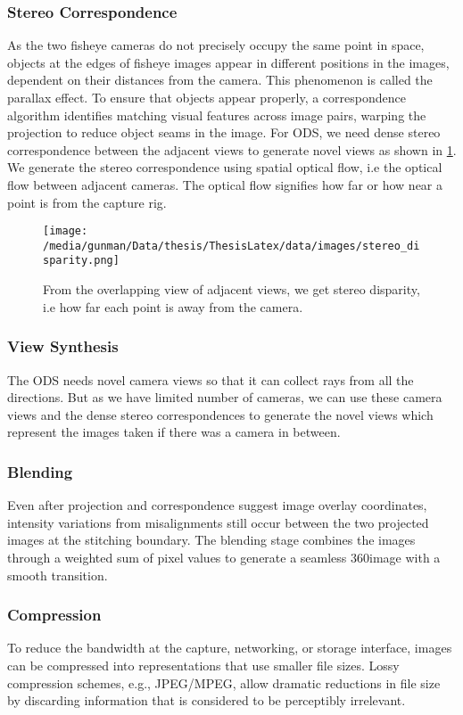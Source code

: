 \subsubsection{Stereo Correspondence}  As the two fisheye cameras do not precisely occupy the same point in space, objects at the edges of fisheye images appear in different positions in the images, dependent on their distances from the camera. This phenomenon is called the parallax effect. To ensure that objects appear properly, a correspondence algorithm identifies matching visual features across image pairs, warping the projection to reduce object seams in the image. For ODS, we need dense stereo correspondence between the adjacent views to generate novel views as shown in \ref{fig:stereo_disparity}. We generate the stereo correspondence using spatial optical flow, i.e the optical flow between adjacent cameras. The optical flow signifies how far or how near a point is from the capture rig. 
\begin{figure}[h]
	\begin{center}
		\texttt{[image: /media/gunman/Data/thesis/ThesisLatex/data/images/stereo\_disparity.png]}		
	\end{center}
	\caption{From the overlapping view of adjacent views, we get stereo disparity, i.e how far each point is away from the camera.}
	\label{fig:stereo_disparity}
\end{figure} 
\subsubsection{View Synthesis}
The ODS needs novel camera views so that it can collect rays from all the directions. But as we have limited number of cameras, we can use these camera views and the dense stereo correspondences to generate the novel views which represent the images taken if there was a camera in between. 
\subsubsection{Blending}  Even after projection and correspondence suggest image overlay coordinates, intensity variations from misalignments still occur between the two projected images at the stitching boundary. The blending stage combines the images through a weighted sum of pixel values to generate a seamless 360\textdegree    image with a smooth transition.	 
\subsubsection{Compression}  To reduce the bandwidth at the capture, networking, or storage interface, images can be compressed into representations that use smaller file sizes. Lossy compression schemes, e.g., JPEG/MPEG, allow dramatic reductions in file size by discarding information that is considered to be perceptibly irrelevant.



